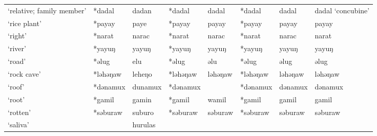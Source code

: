 \begin{landscape}
\begin{longtable}[c]{@{}p{3cm}<{\raggedright}p{2.75cm}<{\raggedright}p{2.75cm}<{\raggedright}p{2.75cm}<{\raggedright}p{2.75cm}<{\raggedright}p{2.75cm}<{\raggedright}p{2.75cm}<{\raggedright}p{2.75cm}<{\raggedright}@{}}
`relative; family member'                            & *dadal             & dadan                          & *dadal             & dadal                      & *dadal           & dadal                    & dadal `concubine'                 \\
`rice plant'                                         & *payay             & paye                           & *payay             & payay                      & *payay           & payay                    & payay                             \\
`right'                                              & *narat             & narac                          & *narat             & narac                      & *narat           & narac                    & narat                             \\
`river'                                              & *yayuŋ             & yayuŋ                          & *yayuŋ             & yayuŋ                      & *yayuŋ           & yayuŋ                    & yayuŋ                             \\
`road'                                               & *əlug              & elu                            & *əlug              & əlu                        & *əlug            & əlug                     & əlug                              \\
`rock cave'                                          & *ləhəŋaw           & leheŋo                         & *ləhəŋaw           & ləhəŋaw                    & *ləhəŋaw         & ləhəŋaw                  & ləhəŋaw                           \\
`roof'                                               & *dənamux           & dunamux                        & *dənamux           &                            & *dənamux         & dənamux                  & dənamux                           \\
`root'                                               & *gamil             & gamin                          & *gamil             & wamil                      & *gamil           & gamil                    & gamil                             \\
`rotten'                                             & *səburaw           & suburo                         & *səburaw           & səburaw                    & *səburaw         & səburaw                  & səburaw                           \\
`saliva'                                             &                    & hurulas                        &                    &                            &                  &                          &                                   \\

\end{longtable}
\end{landscape}
